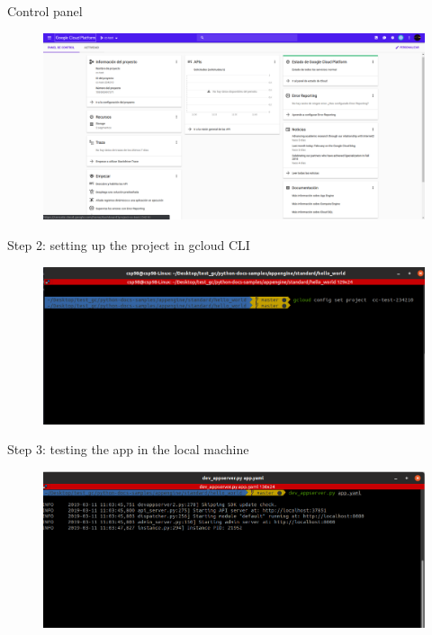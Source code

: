 \documentclass{beamer}
\begin{document}
\begin{frame}[fragile]{Control panel}
    \begin{figure}[H]
      \centering
      \includegraphics[scale=0.2]{img/tutorial/2controlpanel}
    \end{figure}
\end{frame}

\begin{frame}[fragile]{Step 2: setting up the project in gcloud CLI}
    \begin{figure}[H]
      \centering
      \includegraphics[scale=0.33]{img/tutorial/3setproject}
    \end{figure}
\end{frame}

\begin{frame}[fragile]{Step 3: testing the app in the local machine}
    \begin{figure}[H]
      \centering
      \includegraphics[scale=0.33]{img/tutorial/4localdeploy}
    \end{figure}
\end{frame}
\end{document}
